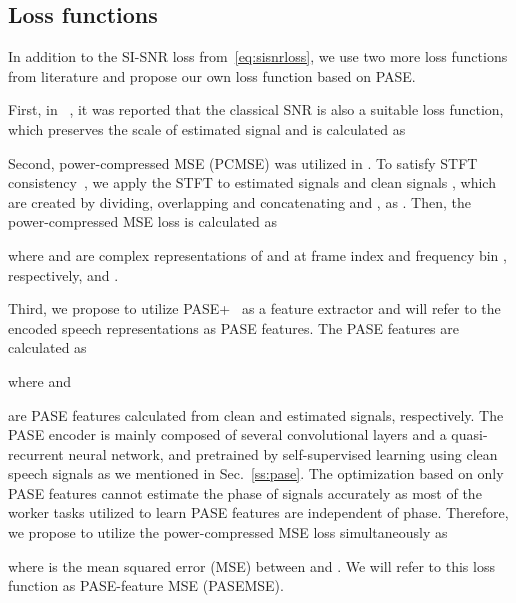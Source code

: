 \documentclass[a4paper]{article}
\begin{document}
\begin{spacing}{0.92}
\subsection{Loss functions}
\label{ss:loss}
In addition to the SI-SNR loss from~\eqref{eq:sisnrloss}, 
we use two more loss functions from literature and propose our own loss function based on PASE.

First, in ~\cite{kinoshita2020improving}, it was reported that the classical SNR is also a suitable loss function, which preserves the scale of estimated signal and is calculated as


Second, power-compressed MSE (PCMSE) was utilized in \cite{wisdom2019differentiable,yin2019phasen,erdogan2018investigations}.
To satisfy STFT consistency~\cite{wisdom2019differentiable}, 
we apply the STFT to estimated signals 
and clean signals , which are created by
dividing, overlapping and concatenating  and   ,
as .
Then, the power-compressed MSE loss is calculated as

where  and  are complex representations of 
 and  at frame index  and frequency bin , respectively,
and .

Third, we propose to utilize PASE+~\cite{ravanelli2020multi} as a feature extractor and will refer to the encoded speech representations as PASE features.  The PASE features are calculated as

where  and

are PASE features calculated from clean and estimated signals, respectively. The PASE encoder is mainly composed of several convolutional layers and a quasi-recurrent neural network,
and pretrained by self-supervised learning using clean speech signals as we mentioned in Sec.~\ref{ss:pase}. 
The optimization based on only PASE features cannot estimate the phase of signals accurately as  most of the worker tasks utilized to learn PASE features are independent of phase.
Therefore, we propose to utilize the power-compressed MSE loss simultaneously as

where  is the mean squared error (MSE) between  and .
We will refer to this loss function as PASE-feature MSE (PASEMSE).

\end{spacing}
\end{document}

